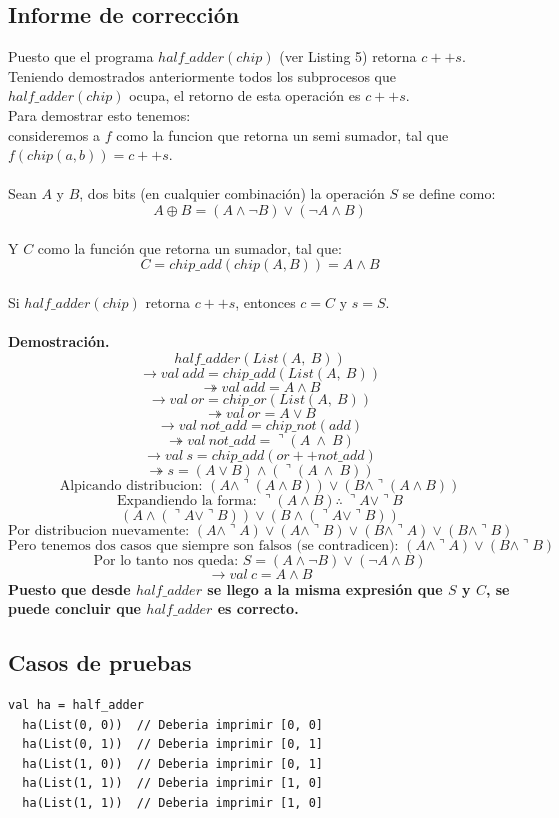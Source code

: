 \documentclass[12pt, a4paper]{article}
\begin{document}
\subsection{Informe de corrección}
Puesto que el programa $half\_adder(chip)$ (ver Listing 5) retorna $c++s$. \\
Teniendo demostrados anteriormente todos los subprocesos que $half\_adder(chip)$ ocupa, el retorno de esta operación es $c ++ s$. \\
Para demostrar esto tenemos:
\\ consideremos a $f$ como la funcion que retorna un semi sumador, tal que $f(chip(a,b)) = c ++ s$.\\ 
\\ Sean \( A \) y \( B \), dos bits (en cualquier combinación) la operación $S$ se define como:
\[ A \oplus B = (A \land \neg B) \lor (\neg A \land B) \]
\\ Y $C$ como la función que retorna un sumador, tal que:
\[ C = chip\_add(chip(A,B)) = A \wedge  B \]\\
Si $half\_adder(chip)$ retorna $c ++ s$, entonces $c = C$ y $s = S$.\\ \\
\textbf{Demostración.}
    \[ half\_adder(List(A,~B))\] 
    \[ \rightarrow val~add = chip\_add(List(A,~B))\] 
    \[ \twoheadrightarrow val~add = A\wedge B\] 
    \[ \rightarrow val~or = chip\_or(List(A,~B))\] 
    \[ \twoheadrightarrow val~or = A\vee B \] 
    \[ \rightarrow val~not\_add = chip\_not(add)\] 
    \[ \twoheadrightarrow val~not\_add = \urcorner (A ~\wedge ~  B) \] 
    \[ \rightarrow val~s = chip\_add(or ++not\_add)\] 
    \[ \twoheadrightarrow s = (A\vee B) \wedge  (\urcorner (A ~\wedge ~  B))\]
    \[ \text{Alpicando distribucion: }(A\wedge \urcorner(A\wedge B))\vee (B\wedge \urcorner(A\wedge B))  \]
    \[ \text{Expandiendo la forma: }\urcorner(A\wedge B)\therefore  ~ \urcorner A \vee \urcorner B \]
    \[ (A\wedge (\urcorner A \vee \urcorner B))\vee (B\wedge (\urcorner A \vee \urcorner B))\]
    \[ \text{Por distribucion nuevamente: } (A \wedge \urcorner A) \vee (A \wedge \urcorner B) \vee (B \wedge \urcorner A) \vee (B \wedge \urcorner B)\]
    \[ \text{Pero tenemos dos casos que siempre son falsos (se contradicen): } (A \wedge \urcorner A) \vee (B \wedge \urcorner B)\]
    \[ \text{Por lo tanto nos queda: } S=(A \land \neg B) \lor (\neg A \land B)\]
    \[ \rightarrow val~c = A\wedge B\] 
\textbf{Puesto que desde $half\_adder$ se llego a la misma expresión que $S$ y $C$, se puede concluir que $half\_adder$ es correcto.}
\subsection{Casos de pruebas}
\begin{lstlisting}[style=scalaStyle, caption=Casos de prueba para la función half\_adder.]
  val ha = half_adder
  ha(List(0, 0))  // Deberia imprimir [0, 0]
  ha(List(0, 1))  // Deberia imprimir [0, 1]
  ha(List(1, 0))  // Deberia imprimir [0, 1]
  ha(List(1, 1))  // Deberia imprimir [1, 0]
  ha(List(1, 1))  // Deberia imprimir [1, 0]
  
\end{lstlisting}
\end{document}
